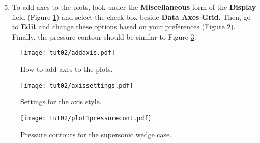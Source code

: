 \begin{enumerate}[label=\arabic*)]
	\setcounter{enumi}{4}
	\item To add axes to the plots, look under the \textbf{Miscellaneous} form of the \textbf{Display} field (Figure \ref{fig2:add axis}) and select the check box beside \textbf{Data Axes Grid}. Then, go to \textbf{Edit} and change these options based on your preferences (Figure \ref{fig2:axis setting}). Finally, the pressure contour should be similar to Figure \ref{fig2:plot pressure cont1}.
\end{enumerate}
\begin{figure}[H]
    \centering
    \texttt{[image: tut02/addaxis.pdf]}
    \caption{How to add axes to the plots.}
    \label{fig2:add axis}
\end{figure}
\begin{figure}[ht]
    \centering
    \texttt{[image: tut02/axissettings.pdf]}
    \caption{Settings for the axis style.}
    \label{fig2:axis setting}
\end{figure}
\begin{figure}[ht]
    \centering
    \texttt{[image: tut02/plot1pressurecont.pdf]}
    \caption{Pressure contours for the supersonic wedge case.}
    \label{fig2:plot pressure cont1}
\end{figure}

